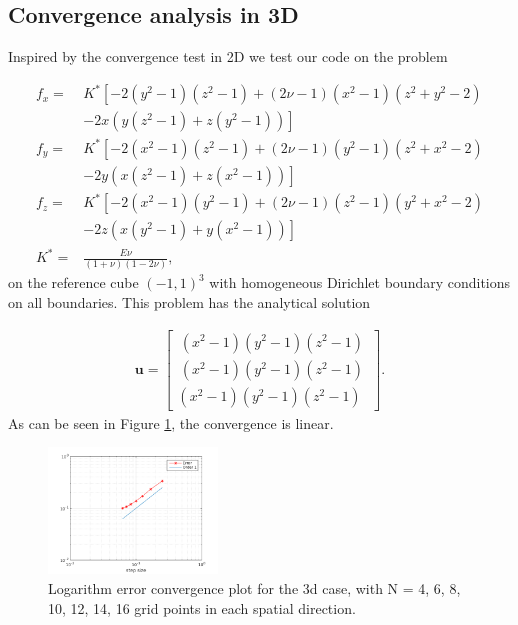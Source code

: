 

\subsection{Convergence analysis in 3D}

Inspired by the convergence test in 2D we test our code on the problem 

\begin{align}
f_x = &K^* \left[-2(y^2-1)(z^2-1) + (2 \nu -1)(x^2-1)(z^2 +y^2-2) \right.\nonumber\\
 &\left. -2x(y(z^2-1) + z(y^2-1)) \right] \\
 f_y = &K^* \left[-2(x^2-1)(z^2-1) + (2 \nu -1)(y^2-1)(z^2 +x^2-2) \right.\nonumber\\
 &\left. -2y(x(z^2-1) + z(x^2-1)) \right] \\
 f_z = &K^* \left[-2(x^2-1)(y^2-1) + (2 \nu -1)(z^2-1)(y^2 +x^2-2) \right.\nonumber\\
 &\left. -2z(x(y^2-1) + y(x^2-1)) \right] \\
 K^* = & \frac{E \nu}{(1+\nu)(1-2\nu)},
\end{align}
on the reference cube $(-1,1)^3$ with homogeneous Dirichlet boundary conditions on all boundaries. This problem has the analytical solution

\begin{align}
\bm{u} = \begin{bmatrix}
\, (x^2-1)(y^2-1)(z^2-1) \, \\
\, (x^2-1)(y^2-1)(z^2-1) \, \\
(x^2-1)(y^2-1)(z^2-1)
\end{bmatrix}.
\end{align}
As can be seen in Figure \ref{fig:convergence3d}, the convergence is linear.

\begin{figure}
\center
\includegraphics[width=0.4\textwidth]{convergence3d}
\caption{Logarithm error convergence plot for the 3d case, with N = 4, 6, 8, 10, 12, 14, 16 grid points in each spatial direction.}
\label{fig:convergence3d}
\end{figure}

